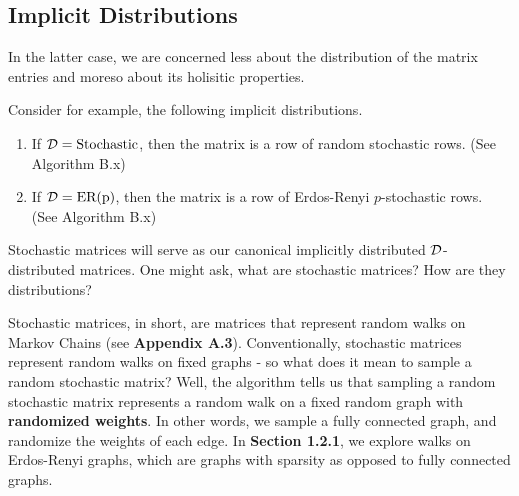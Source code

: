 

\subsection{Implicit Distributions}

In the latter case, we are concerned less about the distribution of the matrix entries and moreso about its holisitic properties.

Consider for example, the following implicit distributions.

\begin{enumerate}
\item If $\mathcal{D} = \text{Stochastic}$, then the matrix is a row of random stochastic rows. (See Algorithm B.x)
\item If $\mathcal{D} = \text{ER(p)}$, then the matrix is a row of Erdos-Renyi $p$-stochastic rows. (See Algorithm B.x)
\end{enumerate}


Stochastic matrices will serve as our canonical implicitly distributed $\mathcal{D}$-distributed matrices.
One might ask, what are stochastic matrices? How are they distributions?

Stochastic matrices, in short, are matrices that represent random walks on Markov Chains (see \textbf{Appendix A.3}).
Conventionally, stochastic matrices represent random walks on fixed graphs - so what does it mean to sample a random stochastic matrix?
Well, the algorithm tells us that sampling a random stochastic matrix represents a random walk on a fixed random graph with \textbf{randomized weights}.
In other words, we sample a fully connected graph, and randomize the weights of each edge. In \textbf{Section 1.2.1}, we explore walks on Erdos-Renyi graphs,
which are graphs with sparsity as opposed to fully connected graphs.

